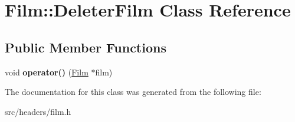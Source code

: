 \hypertarget{class_film_1_1_deleter_film}{\section{Film\-:\-:Deleter\-Film Class Reference}
\label{class_film_1_1_deleter_film}
}
\subsection*{Public Member Functions}
\begin{DoxyCompactItemize}
\item 
\hypertarget{class_film_1_1_deleter_film_a5fd71554d2ed0dc95b096b4820b901ae}{void {\bfseries operator()} (\hyperlink{class_film}{Film} $\ast$film)}\label{class_film_1_1_deleter_film_a5fd71554d2ed0dc95b096b4820b901ae}

\end{DoxyCompactItemize}


The documentation for this class was generated from the following file\-:\begin{DoxyCompactItemize}
\item 
src/headers/film.\-h\end{DoxyCompactItemize}
